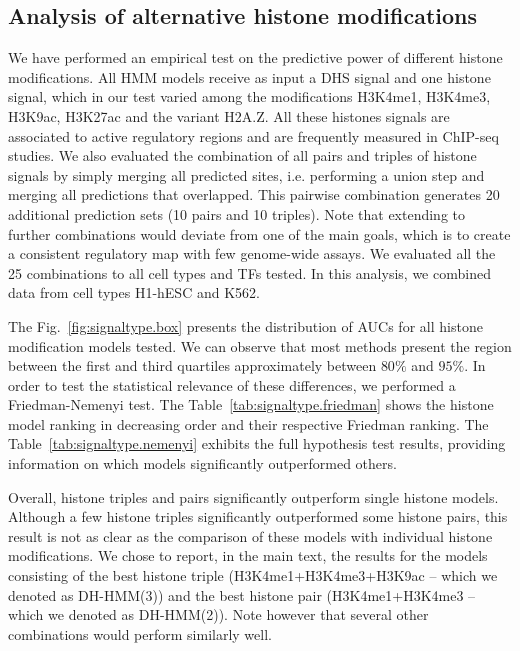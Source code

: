 \documentclass{bioinfo}
\begin{document}
\subsection{Analysis of alternative histone modifications}
\label{sec:hmm.histone.test}

We have performed an empirical test on the predictive power of different
histone modifications. All HMM models receive as input a DHS signal and
one histone signal, which in our test varied among the modifications H3K4me1,
H3K4me3, H3K9ac, H3K27ac and the variant H2A.Z. All these histones signals
are associated to active regulatory regions and are frequently measured in
ChIP-seq studies. We also evaluated the combination of all pairs and triples of histone
signals by simply merging all predicted sites, i.e. performing a union step
and merging all predictions that overlapped. This pairwise combination generates
20 additional prediction sets (10 pairs and 10 triples). Note that extending to further
combinations would deviate from one of the main goals, which is to create
a consistent regulatory map with few genome-wide assays. We evaluated all
the 25 combinations to all cell types and TFs tested.
{\color{black} In this analysis, we combined data from cell
types H1-hESC and K562.}

The Fig.~\ref{fig:signaltype.box} presents the distribution of AUCs for all
histone modification models tested. We can observe that most methods present
the region between the first and third quartiles approximately between $80\%$ and
$95\%$. In order to test the statistical relevance of these differences, we
performed a Friedman-Nemenyi test. The Table~\ref{tab:signaltype.friedman} shows
the histone model ranking in decreasing order and their respective Friedman ranking.
The Table~\ref{tab:signaltype.nemenyi} exhibits the full hypothesis test results,
providing information on which models significantly outperformed others.

Overall, histone triples and pairs significantly outperform single histone models.
Although a few histone triples significantly outperformed some histone pairs, this
result is not as clear as the comparison of these models with individual histone
modifications. We chose to report, in the main text, the results for the models
consisting of the best histone triple (H3K4me1+H3K4me3+H3K9ac -- which we denoted
as DH-HMM(3)) and the best histone pair (H3K4me1+H3K4me3 -- which we denoted as
DH-HMM(2)). Note however that several other combinations would perform similarly well.
\end{document}
